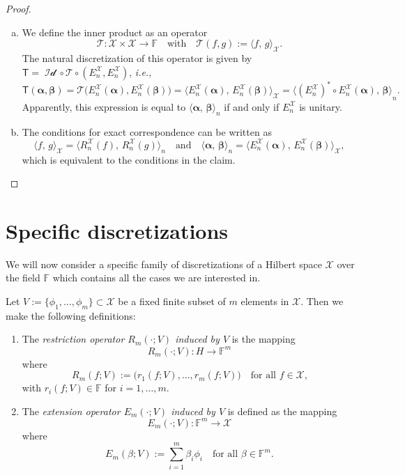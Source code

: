 \documentclass[a4paper]{paper}
\newcommand{\Spc}[1]{\mathscr{#1}}
\newcommand{\Field}{\mathbb{F}}
\newcommand{\Op}[1]{\mathcal{#1}}
\newcommand{\DiscOp}[1]{\mathsf{#1}}
\newcommand*{\EXT}[2]{\ensuremath{E_{#1}^{#2}}}
\newcommand*{\REST}[2]{\ensuremath{R_{#1}^{#2}}}
\newcommand*{\RnX}{\ensuremath{\REST{n}{\Spc{X}}}}
\newcommand*{\EnX}{\ensuremath{\EXT{n}{\Spc{X}}}}
\DeclareMathOperator{\Id}{Id}
\newcommand*{\INNER}[2]{\ensuremath{\langle #1,\,#2\rangle}}
\newcommand*{\INNERbig}[2]{\ensuremath{\big\langle #1,\,#2\big\rangle}}
\newcommand{\ie}{\textsl{i.e.}\xspace}
\newcommand{\valpha}{\boldsymbol{\alpha}}
\newcommand{\vbeta}{\boldsymbol{\beta}}
\begin{document}
\begin{proof}
 \begin{enumerate}[(a)]
  \item We define the inner product as an operator
  \begin{equation*}
   \Op{T} \colon \Spc{X} \times \Spc{X} \to \Field
   \quad \text{with} \quad
   \Op{T}(f, g) := \INNER{f}{g}_{\Spc{X}}.
  \end{equation*}
  The natural discretization of this operator is given by $\DiscOp{T} = \Op{\Id} \circ \Op{T} \circ (\EnX, \EnX)$, \ie,
  \begin{equation*}
   \DiscOp{T}(\valpha, \vbeta) 
   = \Op{T}\big( \EnX(\valpha), \EnX(\vbeta) \big) 
   = \INNERbig{\EnX(\valpha)}{\EnX(\vbeta)}_{\Spc{X}}
   = \INNERbig{(\EnX)^* \circ \EnX(\valpha)}{\vbeta}_n.
  \end{equation*}
  Apparently, this expression is equal to $\INNER{\valpha}{\vbeta}_n$ if and only if $\EnX$ is unitary.

  \item The conditions for exact correspondence can be written as
  \begin{equation*}
   \INNER{f}{g}_{\Spc{X}} = \INNERbig{\RnX(f)}{\RnX(g)}_n
   \quad \text{and} \quad
   \INNER{\valpha}{\vbeta}_n = \INNERbig{\EnX(\valpha)}{\EnX(\vbeta)}_{\Spc{X}},
  \end{equation*}
  which is equivalent to the conditions in the claim.
 \end{enumerate}
\end{proof}


\section{Specific discretizations}
\label{sec:specific_discretizations}

We will now consider a specific family of discretizations of a Hilbert space $\Spc{X}$ over the 
field $\Field$ which contains all the cases we are interested in. 
\begin{definition}
  Let $V:=\{ \phi_{1},\ldots,\phi_{m} \}\subset \Spc{X}$ be a fixed finite subset of $m$ elements in $\Spc{X}$.
  Then we make the following definitions:
  \begin{enumerate}
  \item The \emph{restriction operator $R_{m}(\cdot;V)$ induced by $V$} is the  mapping  
    \[ R_{m}(\cdot;V) \colon H \to \Field^{m} \]
    where 
    \[ R_{m}(f;V):=\bigl( r_{1}(f;V),\ldots,r_{m}(f;V) \bigr) 
       \quad\text{for all $f\in \Spc{X}$,} \]
    with $r_{i}(f;V)\in \Field$ for $i=1,\ldots,m$.
  \item The \emph{extension operator $E_{m}(\cdot;V)$ induced by 
    $V$} is defined as the mapping  
    \[ E_{m}(\cdot;V) \colon \Field^{m} \to \Spc{X} \]
    where 
    \[ E_{m}(\beta;V):=  \sum_{i=1}^m \beta_i \phi_{i}
       \quad\text{for all $\beta\in \Field^{m}$.} \]      
  \end{enumerate}
\end{definition}
\end{document}
